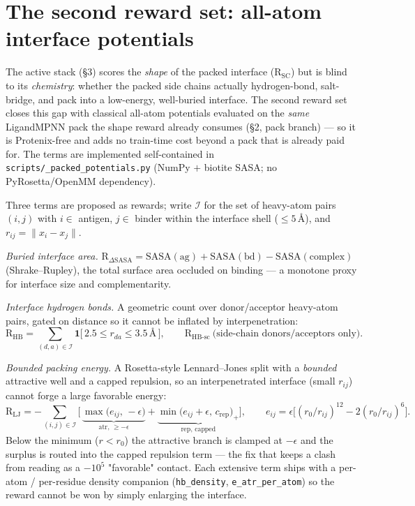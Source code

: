 \documentclass[11pt]{article}
\newcommand{\R}{\mathrm{R}}
\newcommand{\SC}{\mathrm{SC}}
\newcommand{\ttk}[1]{\texttt{\small #1}}
\begin{document}
\section{The second reward set: all-atom interface potentials}
\label{sec:potentials}
The active stack (\S3) scores the \emph{shape} of the packed interface ($\R_{\SC}$) but is blind to
its \emph{chemistry}: whether the packed side chains actually hydrogen-bond, salt-bridge, and pack
into a low-energy, well-buried interface. The second reward set closes this gap with classical
all-atom potentials evaluated on the \emph{same} LigandMPNN pack the shape reward already consumes
(\S2, pack branch) --- so it is Protenix-free and adds no train-time cost beyond a pack that is
already paid for. The terms are implemented self-contained in \ttk{scripts/\_packed\_potentials.py}
(NumPy $+$ biotite SASA; no PyRosetta/OpenMM dependency).

Three terms are proposed as rewards; write $\mathcal I$ for the set of heavy-atom pairs $(i,j)$ with
$i\in$ antigen, $j\in$ binder within the interface shell ($\le 5$\,\AA), and $r_{ij}=\lVert
x_i-x_j\rVert$.

\emph{Buried interface area.} $\R_{\Delta\mathrm{SASA}}=\mathrm{SASA}(\mathrm{ag})+
\mathrm{SASA}(\mathrm{bd})-\mathrm{SASA}(\mathrm{complex})$ (Shrake--Rupley), the total surface
area occluded on binding --- a monotone proxy for interface size and complementarity.

\emph{Interface hydrogen bonds.} A geometric count over donor/acceptor heavy-atom pairs, gated on
distance so it cannot be inflated by interpenetration:
\[
\R_{\mathrm{HB}}=\!\!\sum_{(d,a)\in\mathcal I}\!\!
   \mathbf 1\big[\,2.5\le r_{da}\le 3.5\,\text{\AA}\,\big],
\qquad
\R_{\mathrm{HB\text{-}sc}}\ \text{(side-chain donors/acceptors only).}
\]

\emph{Bounded packing energy.} A Rosetta-style Lennard--Jones split with a \emph{bounded} attractive
well and a capped repulsion, so an interpenetrated interface (small $r_{ij}$) cannot forge a large
favorable energy:
\[
\R_{\mathrm{LJ}}=-\!\!\sum_{(i,j)\in\mathcal I}\Big[\,
   \underbrace{\max\!\big(e_{ij},\,-\epsilon\big)}_{\text{atr, }\ge-\epsilon}
   +\underbrace{\min\!\big(e_{ij}+\epsilon,\,c_{\mathrm{rep}}\big)_{+}}_{\text{rep, capped}}\Big],
\qquad
e_{ij}=\epsilon\big[(r_0/r_{ij})^{12}-2(r_0/r_{ij})^{6}\big].
\]
Below the minimum ($r<r_0$) the attractive branch is clamped at $-\epsilon$ and the surplus is
routed into the capped repulsion term --- the fix that keeps a clash from reading as a $-10^{5}$
"favorable" contact. Each extensive term ships with a per-atom / per-residue density companion
(\ttk{hb\_density}, \ttk{e\_atr\_per\_atom}) so the reward cannot be won by simply enlarging the
interface.
\end{document}

